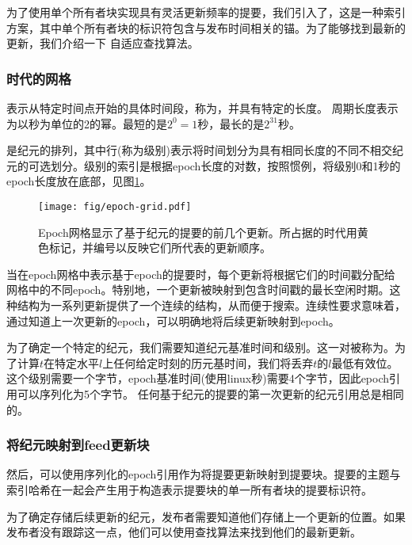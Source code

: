 \yellow{}

为了使用单个所有者块实现具有灵活更新频率的提要，我们引入了，这是一种索引方案，其中单个所有者块的标识符包含与发布时间相关的锚。为了能够找到最新的更新，我们介绍一下
自适应查找算法。 

\subsubsection{时代的网格}

表示从特定时间点开始的具体时间段，称为，并具有特定的长度。
周期长度表示为以秒为单位的2的幂。最短的是$2^0 = 1$秒，最长的是$2^{31}$秒。

是纪元的排列，其中行(称为级别)表示将时间划分为具有相同长度的不同不相交纪元的可选划分。级别的索引是根据epoch长度的对数，按照惯例，将级别0和1秒的epoch长度放在底部，见图\ref{fig:epoch-grid}。

\begin{figure}[htbp]
\centering
\texttt{[image: fig/epoch-grid.pdf]}
\caption[Epoch网格与基于纪元的feed updates\statusorange]{Epoch网格显示了基于纪元的提要的前几个更新。所占据的时代用黄色标记，并编号以反映它们所代表的更新顺序。 }
\label{fig:epoch-grid}
\end{figure}

当在epoch网格中表示基于epoch的提要时，每个更新将根据它们的时间戳分配给网格中的不同epoch。特别地，一个更新被映射到包含时间戳的最长空闲时期。这种结构为一系列更新提供了一个连续的结构，从而便于搜索。连续性要求意味着，通过知道上一次更新的epoch，可以明确地将后续更新映射到epoch。


为了确定一个特定的纪元，我们需要知道纪元基准时间和级别。这一对被称为。为了计算$t$在特定水平$l$上任何给定时刻的历元基时间，我们将丢弃$t$的$l$最低有效位。
这个级别需要一个字节，epoch基准时间(使用linux秒)需要4个字节，因此epoch引用可以序列化为5个字节。
任何基于纪元的提要的第一次更新的纪元引用总是相同的。

\subsubsection{将纪元映射到feed更新块}

然后，可以使用序列化的epoch引用作为将提要更新映射到提要块。提要的主题与索引哈希在一起会产生用于构造表示提要块的单一所有者块的提要标识符。

为了确定存储后续更新的纪元，发布者需要知道他们存储上一个更新的位置。如果发布者没有跟踪这一点，他们可以使用查找算法来找到他们的最新更新。



